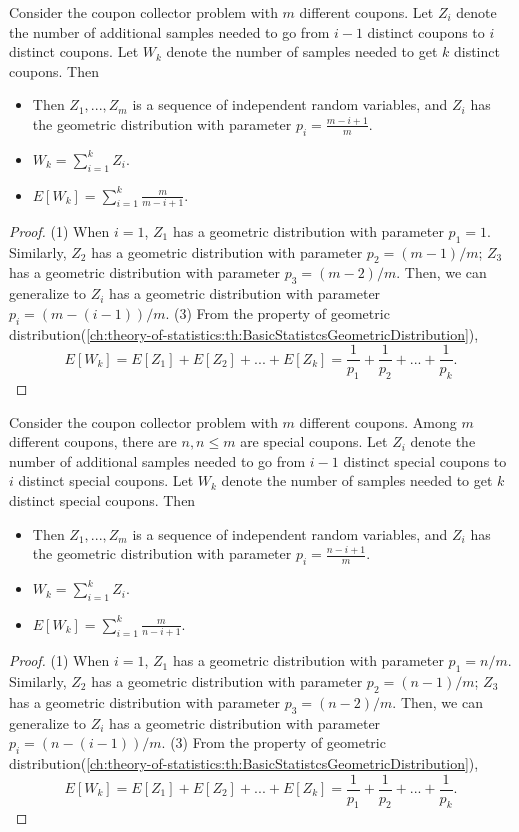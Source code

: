 \begin{refsection}
\begin{lemma}
Consider the coupon collector problem with $m$ different coupons. 	
Let $Z_i$ denote the number of additional samples needed to go from $i-1$ distinct coupons to $i$ distinct coupons. Let $W_k$ denote the number of samples needed to get $k$ distinct coupons. Then
\begin{itemize}
	\item Then $Z_1,...,Z_m$ is a sequence of independent random variables, and $Z_i$ has the geometric distribution with parameter $p_i = \frac{m-i+1}{m}$.
	\item $W_k = \sum_{i=1}^{k}Z_i$.
	\item $E[W_k] = \sum_{i=1}^k \frac{m}{m-i+1}$.
\end{itemize}
\end{lemma}
\begin{proof}
(1) When $i=1$, $Z_1$ has a geometric distribution with parameter $p_1 = 1$. Similarly, $Z_2$ has a geometric distribution with parameter $p_2 = (m-1)/m$; $Z_3$ has a geometric distribution with parameter $p_3 = (m-2)/m$. Then, we can generalize to $Z_i$ has a geometric distribution with parameter $p_i = (m-(i-1))/m$.
(3) From the property of geometric distribution(\autoref{ch:theory-of-statistics:th:BasicStatistcsGeometricDistribution}),
$$E[W_k] = E[Z_1] + E[Z_2] + ... + E[Z_k] = \frac{1}{p_1} + \frac{1}{p_2} + ... + \frac{1}{p_k}.$$
\end{proof}

\begin{lemma}
	Consider the coupon collector problem with $m$ different coupons. Among $m$ different coupons, there are $n, n\leq m$ are special coupons. 	
	Let $Z_i$ denote the number of additional samples needed to go from $i-1$ distinct special coupons to $i$ distinct special coupons. Let $W_k$ denote the number of samples needed to get $k$ distinct special coupons. Then
	\begin{itemize}
		\item Then $Z_1,...,Z_m$ is a sequence of independent random variables, and $Z_i$ has the geometric distribution with parameter $p_i = \frac{n-i+1}{m}$.
		\item $W_k = \sum_{i=1}^{k}Z_i$.
		\item $E[W_k] = \sum_{i=1}^k \frac{m}{n-i+1}$.
	\end{itemize}
\end{lemma}
\begin{proof}
	(1) When $i=1$, $Z_1$ has a geometric distribution with parameter $p_1 = n/m$. Similarly, $Z_2$ has a geometric distribution with parameter $p_2 = (n-1)/m$; $Z_3$ has a geometric distribution with parameter $p_3 = (n-2)/m$. Then, we can generalize to $Z_i$ has a geometric distribution with parameter $p_i = (n-(i-1))/m$.
	(3) From the property of geometric distribution(\autoref{ch:theory-of-statistics:th:BasicStatistcsGeometricDistribution}),
	$$E[W_k] = E[Z_1] + E[Z_2] + ... + E[Z_k] = \frac{1}{p_1} + \frac{1}{p_2} + ... + \frac{1}{p_k}.$$
\end{proof}



\end{refsection}
